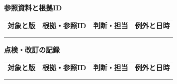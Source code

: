 \documentclass[11pt,a4paper]{article}
\begin{document}
\par{}\noindent\textbf{参照資料と根拠ID}\par\vspace{1mm}
{\fontsize{8.5}{13}\selectfont
\begin{tabularx}{\linewidth}{@{}XXXX@{}}
\textbf{対象と版} & \textbf{根拠・参照ID} & \textbf{判断・担当} & \textbf{例外と日時}\\[2mm]
\strut & \strut & \strut & \strut\\[5mm]
\strut & \strut & \strut & \strut\\[5mm]
\end{tabularx}
}\vspace{2mm}\par
{}
\par{}\noindent\textbf{点検・改訂の記録}\par\vspace{1mm}
{\fontsize{8.5}{13}\selectfont
\begin{tabularx}{\linewidth}{@{}XXXX@{}}
\textbf{対象と版} & \textbf{根拠・参照ID} & \textbf{判断・担当} & \textbf{例外と日時}\\[2mm]
\strut & \strut & \strut & \strut\\[5mm]
\strut & \strut & \strut & \strut\\[5mm]
\end{tabularx}
}\vspace{2mm}\par
\end{document}
